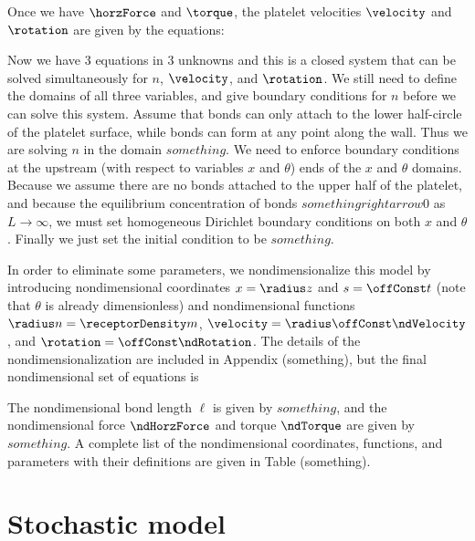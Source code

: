 Once we have $\horzForce$ and $\torque$, the platelet velocities
$\velocity$ and $\rotation$ are given by the equations: %

Now we have 3 equations in 3 unknowns and this is a closed system that
can be solved simultaneously for $n$, $\velocity$, and $\rotation$. We
still need to define the domains of all three variables, and give
boundary conditions for $n$ before we can solve this system. Assume
that bonds can only attach to the lower half-circle of the platelet
surface, while bonds can form at any point along the wall. Thus we are
solving $n$ in the domain $something$. We need to enforce boundary
conditions at the upstream (with respect to variables $x$ and
$\theta$) ends of the $x$ and $\theta$ domains. Because we assume
there are no bonds attached to the upper half of the platelet, and
because the equilibrium concentration of bonds $something rightarrow
0$ as $L \rightarrow \infty$, we must set homogeneous Dirichlet
boundary conditions on both $x$ and $\theta$. Finally we just set the
initial condition to be $something$.

In order to eliminate some parameters, we nondimensionalize this model
by introducing nondimensional coordinates $x = \radius z$ and $s =
\offConst t$ (note that $\theta$ is already dimensionless) and
nondimensional functions $\radius n = \receptorDensity m$, $\velocity
= \radius \offConst \ndVelocity$, and $\rotation = \offConst
\ndRotation$. The details of the nondimensionalization are included in
Appendix (something), but the final nondimensional set of equations is

The nondimensional bond length $\ell$ is given by $something$, and the
nondimensional force $\ndHorzForce$ and torque $\ndTorque$ are given
by $something$. A complete list of the nondimensional coordinates,
functions, and parameters with their definitions are given in Table
(something).

\section{Stochastic model}
\label{sec:stochastic-model}

